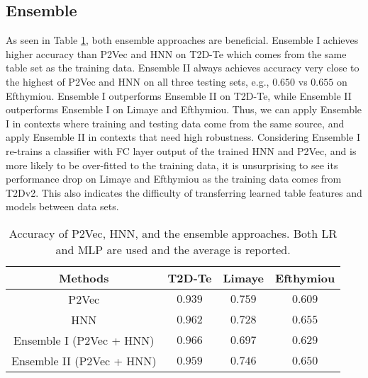 \documentclass{article}
\begin{document}
\subsection{Ensemble}
As seen in Table \ref{res:ensemble}, both ensemble approaches are beneficial.
Ensemble I achieves higher accuracy than P2Vec and HNN on T2D-Te which comes from the same table set as the training data.
Ensemble II always achieves accuracy very close to the highest of P2Vec and HNN on all three testing sets, e.g., $0.650$ vs $0.655$ on Efthymiou. 
Ensemble I outperforms Ensemble II on T2D-Te, 
while Ensemble II outperforms Ensemble I on Limaye and Efthymiou.
Thus, we can apply Ensemble I in contexts where training and testing data come from the same source, 
and apply Ensemble II in contexts that need high robustness.
Considering Ensemble I re-trains a classifier with FC layer output of the trained HNN and P2Vec, and is more likely to be over-fitted to the training data, 
it is unsurprising to see its performance drop on Limaye and Efthymiou as the training data comes from T2Dv2.
This also indicates the difficulty of transferring learned table features and models between data sets.


\begin{table}[h!]
\scriptsize{
\centering
\begin{tabular}[t]{c|c|c|c}
\hline
Methods & T2D-Te & Limaye & Efthymiou    \\\hline 
 P2Vec &$0.939$ &$\bm{0.759}$ &$0.609$  \\
 HNN   &$\bm{0.962}$ &$0.728$ &$\bm{0.655}$  \\\hline
 Ensemble I (P2Vec + HNN)  &$\bm{0.966}$ &$0.697$ &$0.629$  \\
 Ensemble II (P2Vec + HNN) &$0.959$ &$\bm{0.746}$ &$\bm{0.650}$  \\\hline
\end{tabular}
\vspace{-0.2cm}
\caption{\footnotesize
Accuracy of P2Vec, HNN, and the ensemble approaches.
Both LR and MLP are used and the average is reported.
}\label{res:ensemble}
}
\end{table}
    
\end{document}
